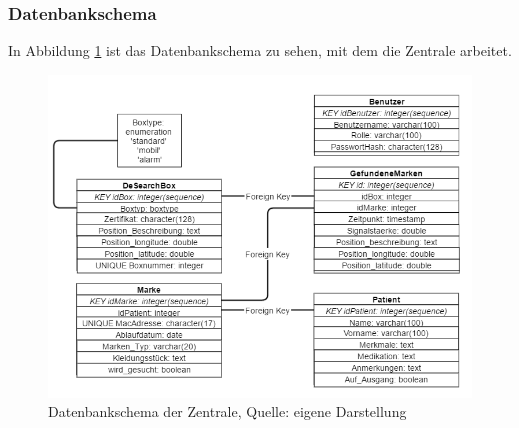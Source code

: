 \subsubsection{Datenbankschema}\label{sssec:db}
In Abbildung \ref{img:db-schema} ist das Datenbankschema zu sehen, mit dem die Zentrale arbeitet. 
\begin{figure}
	\centering
	\includegraphics[width=1.0\linewidth]{images/db-schema}
	\caption[Datenbankschema der Zentrale]{Datenbankschema der Zentrale, Quelle: eigene Darstellung}
	\label{img:db-schema}
\end{figure}

